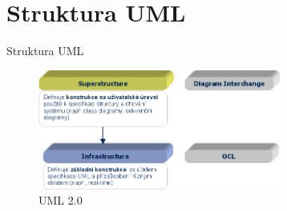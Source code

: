 \section{Struktura UML}



\begin{frame}{Struktura UML}

\begin{figure}
	\includegraphics[width=80mm]{img/standard_uml.png}
	\caption{UML 2.0}
\end{figure}
	
\end{frame}


